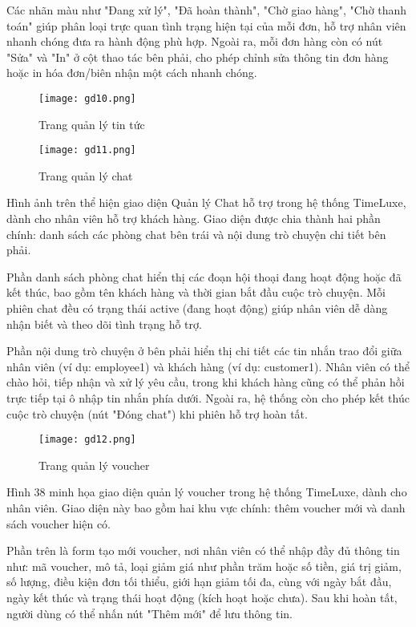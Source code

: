 Các nhãn màu như "Đang xử lý", "Đã hoàn thành", "Chờ giao hàng", "Chờ thanh toán" giúp phân loại trực quan tình trạng hiện tại của mỗi đơn, hỗ trợ nhân viên nhanh chóng đưa ra hành động phù hợp. Ngoài ra, mỗi đơn hàng còn có nút "Sửa" và "In" ở cột thao tác bên phải, cho phép chỉnh sửa thông tin đơn hàng hoặc in hóa đơn/biên nhận một cách nhanh chóng.

\begin{figure}[H]
  \centering
  \texttt{[image: gd10.png]}
  \caption{Trang quản lý tin tức}
  \label{fig:employee-news}
\end{figure}

\begin{figure}[H]
  \centering
  \texttt{[image: gd11.png]}
  \caption{Trang quản lý chat}
  \label{fig:employee-chat}
\end{figure}

Hình ảnh trên thể hiện giao diện Quản lý Chat hỗ trợ trong hệ thống TimeLuxe, dành cho nhân viên hỗ trợ khách hàng. Giao diện được chia thành hai phần chính: danh sách các phòng chat bên trái và nội dung trò chuyện chi tiết bên phải.

Phần danh sách phòng chat hiển thị các đoạn hội thoại đang hoạt động hoặc đã kết thúc, bao gồm tên khách hàng và thời gian bắt đầu cuộc trò chuyện. Mỗi phiên chat đều có trạng thái active (đang hoạt động) giúp nhân viên dễ dàng nhận biết và theo dõi tình trạng hỗ trợ.

Phần nội dung trò chuyện ở bên phải hiển thị chi tiết các tin nhắn trao đổi giữa nhân viên (ví dụ: employee1) và khách hàng (ví dụ: customer1). Nhân viên có thể chào hỏi, tiếp nhận và xử lý yêu cầu, trong khi khách hàng cũng có thể phản hồi trực tiếp tại ô nhập tin nhắn phía dưới. Ngoài ra, hệ thống còn cho phép kết thúc cuộc trò chuyện (nút "Đóng chat") khi phiên hỗ trợ hoàn tất.

\begin{figure}[H]
  \centering
  \texttt{[image: gd12.png]}
  \caption{Trang quản lý voucher}
  \label{fig:employee-voucher}
\end{figure}

Hình 38 minh họa giao diện quản lý voucher trong hệ thống TimeLuxe, dành cho nhân viên. Giao diện này bao gồm hai khu vực chính: thêm voucher mới và danh sách voucher hiện có.

Phần trên là form tạo mới voucher, nơi nhân viên có thể nhập đầy đủ thông tin như: mã voucher, mô tả, loại giảm giá như phần trăm hoặc số tiền, giá trị giảm, số lượng, điều kiện đơn tối thiểu, giới hạn giảm tối đa, cùng với ngày bắt đầu, ngày kết thúc và trạng thái hoạt động (kích hoạt hoặc chưa). Sau khi hoàn tất, người dùng có thể nhấn nút "Thêm mới" để lưu thông tin.

